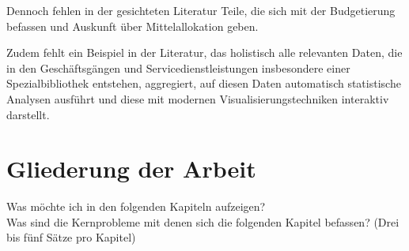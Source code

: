 Dennoch fehlen in der gesichteten Literatur Teile, die sich mit der Budgetierung
befassen und Auskunft über Mittelallokation geben.

Zudem fehlt ein Beispiel in der Literatur, das holistisch alle relevanten Daten, die in den
Geschäftsgängen und Servicedienstleistungen insbesondere einer Spezialbibliothek entstehen,
aggregiert, auf diesen Daten automatisch statistische Analysen ausführt und diese mit modernen Visualisierungstechniken
interaktiv darstellt.

\section{Gliederung der Arbeit}

Was möchte ich in den folgenden Kapiteln aufzeigen?\\
Was sind die Kernprobleme mit denen sich die folgenden Kapitel befassen? (Drei bis fünf Sätze pro Kapitel)
